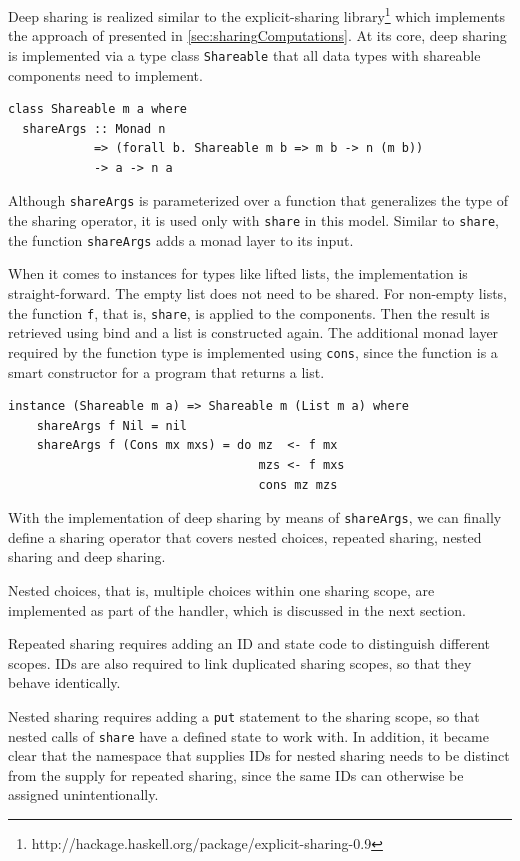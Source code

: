 \documentclass[a4paper, 11pt, fleqn, twoside, abstract=on]{scrreprt}
\newcommand{\hinl}[1]{\texttt{#1}}
\begin{document}
Deep sharing is realized similar to the explicit-sharing library\footnote{http://hackage.haskell.org/package/explicit-sharing-0.9} which implements the approach of \citep{fischer2009purely} presented in \autoref{sec:sharingComputations}.
At its core, deep sharing is implemented via a type class \hinl{Shareable} that all data types with shareable components need to implement.

\begin{verbatim}
class Shareable m a where
  shareArgs :: Monad n 
            => (forall b. Shareable m b => m b -> n (m b))
            -> a -> n a
\end{verbatim}

Although \hinl{shareArgs} is parameterized over a function that generalizes the type of the sharing operator, it is used only with \hinl{share} in this model.
Similar to \hinl{share}, the function \hinl{shareArgs} adds a monad layer to its input.

When it comes to instances for types like lifted lists, the implementation is straight-forward.
The empty list does not need to be shared.
For non-empty lists, the function \hinl{f}, that is, \hinl{share}, is applied to the components.
Then the result is retrieved using bind and a list is constructed again.
The additional monad layer required by the function type is implemented using \hinl{cons}, since the function is a smart constructor for a program that returns a list.

\begin{verbatim}
instance (Shareable m a) => Shareable m (List m a) where
    shareArgs f Nil = nil
    shareArgs f (Cons mx mxs) = do mz  <- f mx
                                   mzs <- f mxs
                                   cons mz mzs
\end{verbatim}

With the implementation of deep sharing by means of \hinl{shareArgs}, we can finally define a sharing operator that covers nested choices, repeated sharing, nested sharing and deep sharing.

Nested choices, that is, multiple choices within one sharing scope, are implemented as part of the handler, which is discussed in the next section.

Repeated sharing requires adding an ID and state code to distinguish different scopes.
IDs are also required to link duplicated sharing scopes, so that they behave identically.

Nested sharing requires adding a \hinl{put} statement to the sharing scope, so that nested calls of \hinl{share} have a defined state to work with.
In addition, it became clear that the namespace that supplies IDs for nested sharing needs to be distinct from the supply for repeated sharing, since the same IDs can otherwise be assigned unintentionally.
\end{document}
